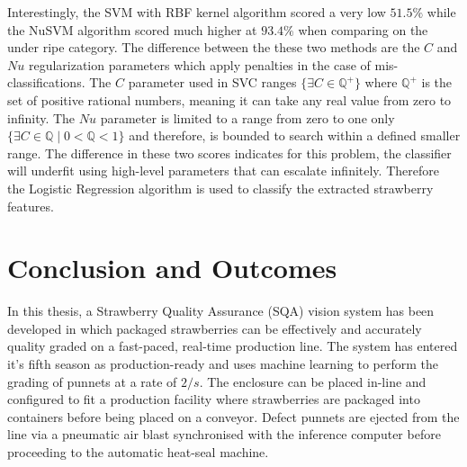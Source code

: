 \documentclass[fleqn,twoside,12pt]{report}
\begin{document}
Interestingly, the SVM with RBF kernel algorithm scored a very low $51.5\%$ while the NuSVM algorithm scored much higher at $93.4\%$ when comparing on the under ripe category. The difference between the these two methods are the $C$ and $Nu$ regularization parameters which apply penalties in the case of mis-classifications. The $C$ parameter used in SVC ranges $\{\exists C\in\mathbb{Q^+}\}$ where $\mathbb{Q^+}$ is the set of positive rational numbers, meaning it can take any real value from zero to infinity. The $Nu$ parameter is limited to a range from zero to one only $\{\exists C\in\mathbb{Q} \mid 0 <\mathbb{Q} < 1\}$ and therefore, is bounded to search within a defined smaller range. The difference in these two scores indicates for this problem, the classifier will underfit using high-level parameters that can escalate infinitely. Therefore the Logistic Regression algorithm is used to classify the extracted strawberry features. 









\newpage

\chapter{Conclusion and Outcomes}


In this thesis, a Strawberry Quality Assurance (SQA) vision system has been developed in which packaged strawberries can be effectively and accurately quality graded on a fast-paced, real-time production line. The system has entered it's fifth season as production-ready and uses machine learning to perform the grading of punnets at a rate of $2/s$. The enclosure can be placed in-line and configured to fit a production facility where strawberries are packaged into containers before being placed on a conveyor. Defect punnets are ejected from the line via a pneumatic air blast synchronised with the inference computer before proceeding to the automatic heat-seal machine.
\end{document}
